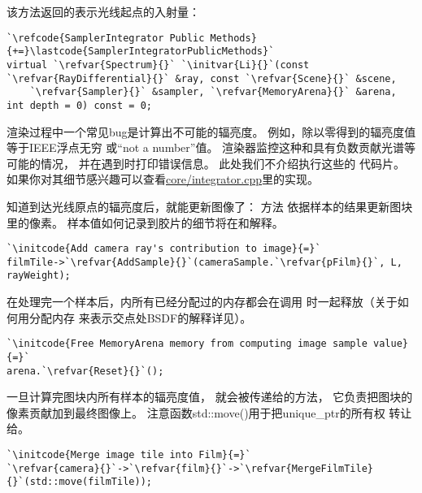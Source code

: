 该方法返回的表示光线起点的入射量：
\begin{lstlisting}
`\refcode{SamplerIntegrator Public Methods}{+=}\lastcode{SamplerIntegratorPublicMethods}`
virtual `\refvar{Spectrum}{}` `\initvar{Li}{}`(const `\refvar{RayDifferential}{}` &ray, const `\refvar{Scene}{}` &scene,
    `\refvar{Sampler}{}` &sampler, `\refvar{MemoryArena}{}` &arena, int depth = 0) const = 0;
\end{lstlisting}

渲染过程中一个常见bug是计算出不可能的辐亮度。
例如，除以零得到的辐亮度值等于IEEE浮点无穷
或“not a number”值。
渲染器监控这种和具有负数贡献光谱等可能的情况，
并在遇到时打印错误信息。
此处我们不介绍执行这些的
代码片。
如果你对其细节感兴趣可以查看\href{https://github.com/mmp/pbrt-v3/tree/master/src/core/integrator.cpp}{\ttfamily core/integrator.cpp}里的实现。

知道到达光线原点的辐亮度后，就能更新图像了：
方法
依据样本的结果更新图块里的像素。
样本值如何记录到胶片的细节将在和解释。
\begin{lstlisting}
`\initcode{Add camera ray's contribution to image}{=}`
filmTile->`\refvar{AddSample}{}`(cameraSample.`\refvar{pFilm}{}`, L, rayWeight);
\end{lstlisting}

在处理完一个样本后，内所有已经分配过的内存都会在调用
时一起释放（关于如何用分配内存
来表示交点处BSDF的解释详见）。
\begin{lstlisting}
`\initcode{Free MemoryArena memory from computing image sample value}{=}`
arena.`\refvar{Reset}{}`();
\end{lstlisting}

一旦计算完图块内所有样本的辐亮度值，
就会被传递给的方法，
它负责把图块的像素贡献加到最终图像上。
注意函数{\ttfamily std::move()}用于把{\ttfamily unique\_ptr}的所有权
转让给。
\begin{lstlisting}
`\initcode{Merge image tile into Film}{=}`
`\refvar{camera}{}`->`\refvar{film}{}`->`\refvar{MergeFilmTile}{}`(std::move(filmTile));
\end{lstlisting}

